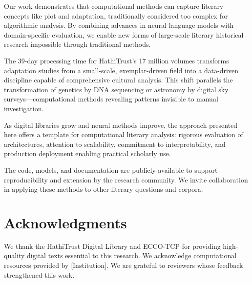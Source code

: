 \documentclass[12pt,a4paper]{article}
\begin{document}
Our work demonstrates that computational methods can capture literary concepts like plot and adaptation, traditionally considered too complex for algorithmic analysis. By combining advances in neural language models with domain-specific evaluation, we enable new forms of large-scale literary historical research impossible through traditional methods.

The 39-day processing time for HathiTrust's 17 million volumes transforms adaptation studies from a small-scale, exemplar-driven field into a data-driven discipline capable of comprehensive cultural analysis. This shift parallels the transformation of genetics by DNA sequencing or astronomy by digital sky surveys—computational methods revealing patterns invisible to manual investigation.

As digital libraries grow and neural methods improve, the approach presented here offers a template for computational literary analysis: rigorous evaluation of architectures, attention to scalability, commitment to interpretability, and production deployment enabling practical scholarly use.

The code, models, and documentation are publicly available to support reproducibility and extension by the research community. We invite collaboration in applying these methods to other literary questions and corpora.

\section*{Acknowledgments}

We thank the HathiTrust Digital Library and ECCO-TCP for providing high-quality digital texts essential to this research. We acknowledge computational resources provided by [Institution]. We are grateful to reviewers whose feedback strengthened this work.



\end{document}
